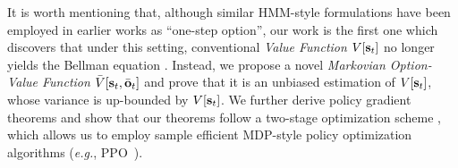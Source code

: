 \documentclass{article}
\begin{document}
It is worth mentioning that, although similar HMM-style
formulations have been employed in earlier works
\cite{henderson2018optiongan,sharma2018directed,shankar2020learning,lee2020learning,zhang2019dac}
as ``one-step option'', our work is the first one which discovers
that under this setting, conventional \emph{Value Function}
$V[{\mathbf{s}}_t]$ no longer yields the Bellman equation
\cite{sutton2018reinforcement}. Instead, we propose a novel
\emph{Markovian Option-Value Function}
$\bar{V}[{\mathbf{s}}_t,\bar{{\mathbf{o}}}_t]$ and prove that it is an unbiased
estimation of $V[{\mathbf{s}}_t]$, whose variance is up-bounded by
$V[{\mathbf{s}}_t]$. We further derive policy gradient theorems and show
that our theorems follow a two-stage optimization scheme
\cite{zhang2019dac}, which allows us to employ sample efficient
MDP-style policy optimization algorithms (\textit{e.g.}, PPO~\cite{witoonchart2017application}).
\vspace{-2mm}
\end{document}
